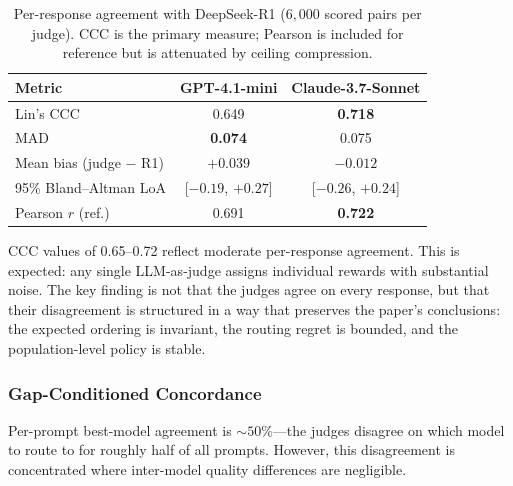 \begin{table}[h]
\centering
\caption{Per-response agreement with DeepSeek-R1 ($6{,}000$ scored pairs
per judge).  CCC is the primary measure; Pearson is included for reference
but is attenuated by ceiling compression.}
\label{tab:judge_agreement}
\small
\begin{tabular}{lcc}
\toprule
\textbf{Metric} & \textbf{GPT-4.1-mini} & \textbf{Claude-3.7-Sonnet} \\
\midrule
Lin's CCC                    & 0.649 & \textbf{0.718} \\
MAD                          & \textbf{0.074} & 0.075 \\
Mean bias (judge $-$ R1)     & $+0.039$ & $-0.012$ \\
95\% Bland--Altman LoA       & [$-0.19$, $+0.27$] & [$-0.26$, $+0.24$] \\
Pearson $r$ (ref.)           & 0.691 & \textbf{0.722} \\
\bottomrule
\end{tabular}
\end{table}

CCC values of 0.65--0.72 reflect moderate per-response agreement.
This is expected: any single LLM-as-judge assigns individual rewards with
substantial noise.  The key finding is not that the judges agree on every
response, but that their disagreement is structured in a way that preserves
the paper's conclusions: the expected ordering is invariant, the routing
regret is bounded, and the population-level policy is stable.

\subsubsection{Gap-Conditioned Concordance}

Per-prompt best-model agreement is ${\sim}50\%$---the judges disagree on
which model to route to for roughly half of all prompts.  However, this
disagreement is concentrated where inter-model quality differences are
negligible.

